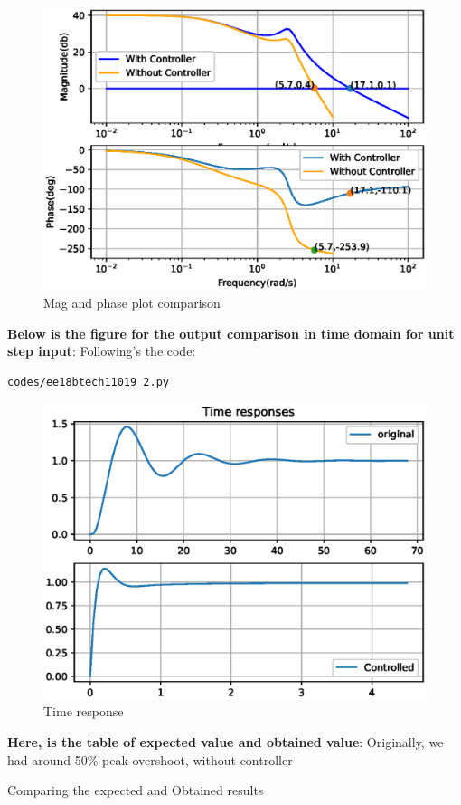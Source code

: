 \begin{enumerate}[label=\thesection.\arabic*.,ref=\thesection.\theenumi]
\begin{figure}[!ht]
    \includegraphics[width=\columnwidth]{./figs/ee18btech11019_6.eps}
  \caption{Mag and phase plot comparison}
  \label{fig:ee18btech11019_fig_plot}
\end{figure}
\textbf{Below is the figure for the output comparison in time domain for unit step input}:\newline
Following's the code:
\begin{lstlisting}
codes/ee18btech11019_2.py
\end{lstlisting}

\begin{figure}[!ht]
    \includegraphics[width=\columnwidth]{./figs/ee18btech11019_7.eps}
  \caption{Time response}
  \label{fig:ee18btech11019_fig_val}
\end{figure}
\textbf{Here, is the table of expected value and obtained value}:\newline
Originally, we had around 50\% peak overshoot, without controller

\begin{table}[!ht]
\centering

\caption{Comparing the expected and Obtained results}
\label{table:ee18btech11019_table}
\end{table}
\end{enumerate}
